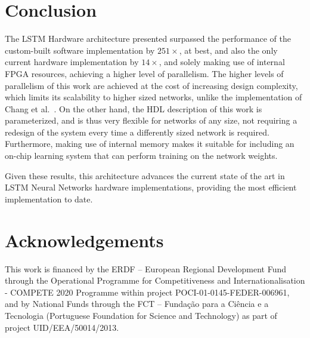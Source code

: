 \documentclass[conference]{IEEEtran}
\begin{document}
\section{Conclusion}\label{sec:concl}
The LSTM Hardware architecture presented surpassed the performance of the custom-built software implementation by $251\times$, at best,
and also the only current hardware implementation by $14\times$, and solely making use of internal FPGA
resources, achieving a higher level of parallelism. The higher levels of parallelism of this work are achieved at the cost of increasing
design complexity, which limits its scalability to higher sized networks, unlike the implementation of Chang et al.~\cite{Chang15}.
On the other hand, the HDL description of this work is parameterized, and is thus very flexible for networks of any size, not requiring
a redesign of the system every time a differently sized network is required. Furthermore, making use of internal memory makes it suitable
for including an on-chip learning system that can perform training on the network weights.

Given these results, this architecture advances the current state of the art in LSTM Neural Networks
hardware implementations, providing the most efficient implementation to date.

\section*{Acknowledgements}
This work is financed by the ERDF – European Regional Development Fund through the Operational Programme for Competitiveness and Internationalisation - COMPETE 2020 Programme within project \guillemotleft POCI-01-0145-FEDER-006961\guillemotright, and by National Funds through the FCT – Fundação para a Ciência e a Tecnologia (Portuguese Foundation for Science and Technology) as part of project \guillemotleft UID/EEA/50014/2013\guillemotright.




\end{document}
